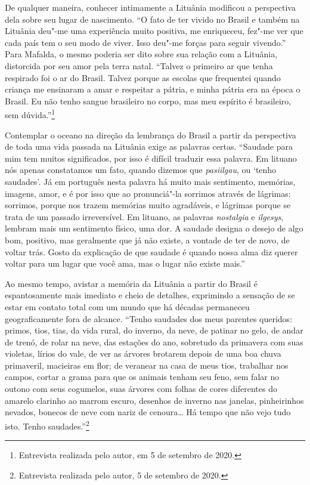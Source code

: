 De qualquer maneira, conhecer intimamente a Lituânia modificou a perspectiva 
dela sobre seu lugar de nascimento. ``O fato de ter vivido no Brasil e também na Lituânia deu"-me
uma experiência muito positiva, me enriqueceu, fez"-me ver que cada país
tem o seu modo de viver. Isso deu"-me forças para seguir vivendo.'' Para
Mafalda, o mesmo poderia ser dito sobre sua relação com a Lituânia,
distorcida por seu amor pela terra natal. ``Talvez o primeiro ar que
tenha respirado foi o ar do Brasil. Talvez porque as escolas que frequentei
quando criança me ensinaram a amar e respeitar a pátria, e minha pátria
era na época o Brasil. Eu não tenho sangue brasileiro no corpo, mas meu
espírito é brasileiro, sem dúvida.''\footnote{Entrevista realizada pelo autor, em 5 de setembro de 2020.}

Contemplar o oceano na direção da lembrança do Brasil a partir da
perspectiva de toda uma vida passada na Lituânia exige as palavras
certas. ``Saudade para mim tem muitos significados, por isso é difícil
traduzir essa palavra. Em lituano nós apenas constatamos um fato, quando
dizemos que \textit{pasiilgau}, ou `tenho saudades'. Já em português nesta
palavra há muito mais sentimento, memórias, imagens, amor, e é por
isso que ao pronunciá"-la sorrimos através de lágrimas: sorrimos,
porque nos trazem memórias muito agradáveis, e lágrimas porque se trata
de um passado irreversível. Em lituano, as palavras
\textit{nostalgia} e \textit{ilgesys}, lembram mais um sentimento
físico, uma dor. A saudade designa o desejo de algo bom, positivo, mas
geralmente que já não existe, a vontade de ter de novo, de voltar trás.
Gosto da explicação de que saudade é quando nossa alma diz querer voltar
para um lugar que você ama, mas o lugar não existe mais.''

Ao mesmo
tempo, avistar a memória da Lituânia a partir do Brasil é espantosamente
mais imediato e cheio de detalhes, exprimindo a sensação de se estar em
contato total com um mundo que há décadas permaneceu geograficamente
fora de alcance. ``Tenho saudades dos meus parentes queridos: primos,
tios, tias, da vida rural, do inverno, da neve, de patinar no gelo, de
andar de trenó, de rolar na neve, das estações do ano, sobretudo da
primavera com suas violetas, lírios do vale, de ver as árvores brotarem
depois de uma boa chuva primaveril, macieiras em flor; de veranear na
casa de meus tios, trabalhar nos campos, cortar a grama para que os
animais tenham seu feno, sem falar no outono com seus cogumelos, suas
árvores com folhas de cores diferentes do amarelo clarinho ao marrom
escuro, desenhos de inverno nas janelas, pinheirinhos nevados, bonecos
de neve com nariz de cenoura\ldots{} Há tempo que não vejo tudo isto. Tenho
saudades.''\footnote{Entrevista realizada pelo autor, 5 de setembro de
  2020.}

